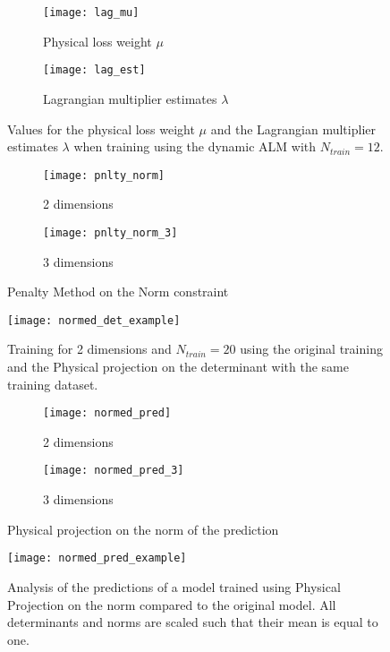 \begin{figure}[H]
	\centering
	\begin{subfigure}{.5\textwidth}
		\centering
		\texttt{[image: lag\_mu]}
		\caption{Physical loss weight $\mu$}
	\end{subfigure}%
	\begin{subfigure}{.5\textwidth}
		\centering
		\texttt{[image: lag\_est]}
		\caption{Lagrangian multiplier estimates $\lambda$}
	\end{subfigure}
	\caption{Values for the physical loss weight $\mu$ and the Lagrangian multiplier estimates $\lambda$ when training using the dynamic ALM with $N_{train} = 12$.}
	\label{fig:mu_lambda_alm_dyn}
\end{figure}


\begin{figure}[H]
	\centering
	\begin{subfigure}{.5\textwidth}
		\centering
		\texttt{[image: pnlty\_norm]}
		\caption{2 dimensions}
	\end{subfigure}%
	\begin{subfigure}{.5\textwidth}
		\centering
		\texttt{[image: pnlty\_norm\_3]}
		\caption{3 dimensions}
	\end{subfigure}
	\caption{Penalty Method on the Norm constraint}
	\label{fig:pnlny_norm}
\end{figure}


\begin{figure}[H]
	\centering
	\texttt{[image: normed\_det\_example]}
	\caption{Training for 2 dimensions and $N_{train} = 20$ using the original training and the Physical projection on the determinant with the same training dataset.}
	\label{fig:normed_det_example}
\end{figure}

\begin{figure}[H]
	\centering
	\begin{subfigure}{.5\textwidth}
		\centering
		\texttt{[image: normed\_pred]}
		\caption{2 dimensions}
	\end{subfigure}%
	\begin{subfigure}{.5\textwidth}
		\centering
		\texttt{[image: normed\_pred\_3]}
		\caption{3 dimensions}
	\end{subfigure}
	\caption{Physical projection on the norm of the prediction}
	\label{fig:normed_pred}
\end{figure}

\begin{figure}[H]
	\centering
	\texttt{[image: normed\_pred\_example]}
	\caption{Analysis of the predictions of a model trained using Physical Projection on the norm compared to the original model. All determinants and norms are scaled such that their mean is equal to one.}
	\label{fig:normed_pred_example}
\end{figure}


\clearpage
